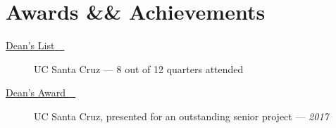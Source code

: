 \documentclass[10pt]{article}
\let\orighref\href%
\renewcommand{\href}[2]{\orighref{#1}{#2{\scriptsize~\color{darkgray}\faExternalLink}}}
\begin{document}
\section*{Awards \&\& Achievements}
\begin{description}
  \item[\href{https://honors.ucsc.edu/honors-programs/deans-honors}{Dean's List}] UC Santa Cruz --- 8 out of 12 quarters attended
  \item[\href{https://ua.soe.ucsc.edu/honors/2016-2017}{Dean's Award}] UC Santa
    Cruz, presented for an outstanding senior project --- \textit{2017}
\end{description}
\end{document}
